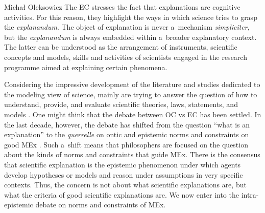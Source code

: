 \begin{artengenv}{Michał Oleksowicz}
The EC stresses the fact that explanations are cognitive activities. For this reason, they highlight the ways in which science tries to grasp the \textit{explanandum}. The object of explanation is never a~mechanism \textit{simpliciter}, but the \textit{explanandum} is always embedded within a~broader explanatory context. The latter can be understood as the arrangement of instruments, scientific concepts and models, skills and activities of scientists engaged in the research programme aimed at explaining certain phenomena.

Considering the impressive development of the literature and studies dedicated to the modeling view of science, mainly are trying to answer the question of how to understand, provide, and evaluate scientific theories, laws, statements, and models
\parencites[][]{meheus_models_2009}[][]{frigg_models_2022}. %
 One might think that the debate between OC vs EC has been settled. In the last decade, however, the debate has shifted from the question ``what is an explanation'' to the \textit{querrelle} on ontic and epistemic norms and constraints on good MEx 
\parencite[][]{illari_mechanistic_2013}. %
 Such a~shift means that philosophers are focused on the question about the kinds of norms and constraints that guide MEx. There is the consensus that scientific explanation is the epistemic phenomenon under which agents develop hypotheses or models and reason under assumptions in very specific contexts. Thus, the concern is not about what scientific explanations are, but what the criteria of good scientific explanations are. We now enter into the intra-epistemic debate on norms and constraints of MEx.


\end{artengenv}
